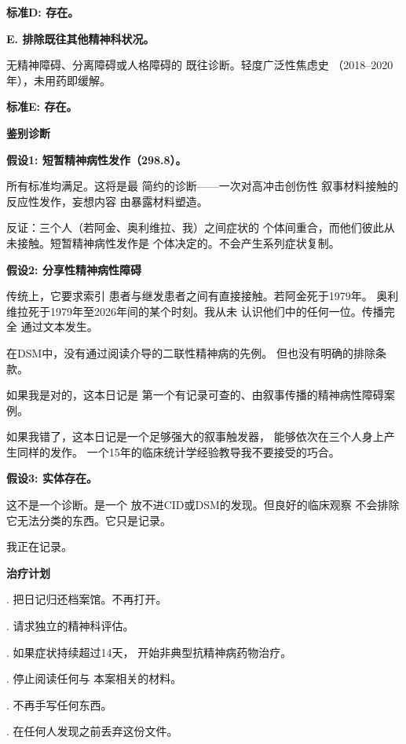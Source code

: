 \noindent \textbf{标准D: 存在。}

\noindent \textbf{E. 排除既往其他精神科状况。}

\noindent 无精神障碍、分离障碍或人格障碍的
\noindent 既往诊断。轻度广泛性焦虑史
\noindent （2018--2020年），未用药即缓解。

\noindent \textbf{标准E: 存在。}

\noindent \textbf{鉴别诊断}

\noindent \textbf{假设1: 短暂精神病性发作（298.8）。}

\noindent 所有标准均满足。这将是最
\noindent 简约的诊断——一次对高冲击创伤性
\noindent 叙事材料接触的反应性发作，妄想内容
\noindent 由暴露材料塑造。

\noindent 反证：三个人（若阿金、奥利维拉、我）之间症状的
\noindent 个体间重合，而他们彼此从未接触。短暂精神病性发作是
\noindent 个体决定的。不会产生系列症状复制。

\noindent \textbf{假设2: 分享性精神病性障碍}

\noindent 传统上，它要求索引
\noindent 患者与继发患者之间有直接接触。若阿金死于1979年。
\noindent 奥利维拉死于1979年至2026年间的某个时刻。我从未
\noindent 认识他们中的任何一位。传播完全
\noindent 通过文本发生。

\noindent 在DSM中，没有通过阅读介导的二联性精神病的先例。
\noindent 但也没有明确的排除条款。

\noindent 如果我是对的，这本日记是
\noindent 第一个有记录可查的、由叙事传播的精神病性障碍案例。

\noindent 如果我错了，这本日记是一个足够强大的叙事触发器，
\noindent 能够依次在三个人身上产生同样的发作。
\noindent 一个15年的临床统计学经验教导我不要接受的巧合。

\noindent \textbf{假设3: 实体存在。}

\noindent 这不是一个诊断。是一个
\noindent 放不进CID或DSM的发现。但良好的临床观察
\noindent 不会排除它无法分类的东西。它只是记录。

\noindent 我正在记录。

\noindent \textbf{治疗计划}

. 把日记归还档案馆。不再打开。

. 请求独立的精神科评估。

. 如果症状持续超过14天，
\noindent 开始非典型抗精神病药物治疗。

. 停止阅读任何与
\noindent 本案相关的材料。

. 不再手写任何东西。

. 在任何人发现之前丢弃这份文件。

